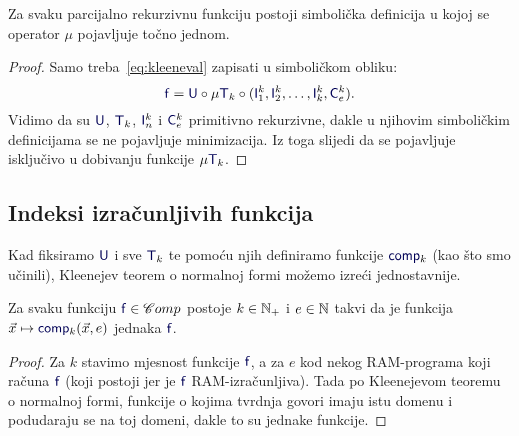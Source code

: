 \begin{korolar}[{name=[jedna minimizacija je dovoljna]}]
Za svaku parcijalno rekurzivnu funkciju postoji simbolička definicija \newline u kojoj se operator $\mu$ pojavljuje točno jednom.
\end{korolar}
\begin{proof}
Samo treba~\eqref{eq:kleeneval} zapisati u simboličkom obliku:
\begin{equation}
    \f f=\f U\circ\mu\f T_k\circ(\f I_1^k,\f I_2^k,\dotsc,\f I_k^k,\f C_e^k)\text.
\end{equation}
Vidimo da su $\f U$, $\f T_k$, $\f I_n^k$ i $\f C_e^k$ primitivno rekurzivne, dakle u njihovim simboličkim definicijama se ne pojavljuje minimizacija. Iz toga slijedi da se pojavljuje isključivo u dobivanju funkcije $\mu\f T_k$.
\end{proof}


\subsection{Indeksi izračunljivih funkcija}

Kad fiksiramo $\f U$ i sve $\f T_k$ te pomoću njih definiramo funkcije $\f{comp}_k$ (kao što smo učinili), Kleenejev teorem o normalnoj formi možemo izreći jednostavnije.

\begin{korolar}[{name=[svaka izračunljiva funkcija je specijalizacija univerzalne]}]\label{kor:pimi}
Za svaku funkciju $\f f\in\mathscr Comp$ postoje $k\in{\mathbb N}_+$ i $e\in{\mathbb N}$ takvi da je funkcija $\vec x\mapsto\f{comp}_k(\vec x,e)$ jednaka $\f f$.
\end{korolar}

\begin{proof}
Za $k$ stavimo mjesnost funkcije $\f f$, a za $e$ kod nekog RAM-programa koji računa $\f f$ (koji postoji jer je $\f f$ RAM-izračunljiva). Tada po Kleenejevom teoremu o normalnoj formi, funkcije o kojima tvrdnja govori imaju istu domenu i podudaraju se na toj domeni, dakle to su jednake funkcije.
\end{proof}

